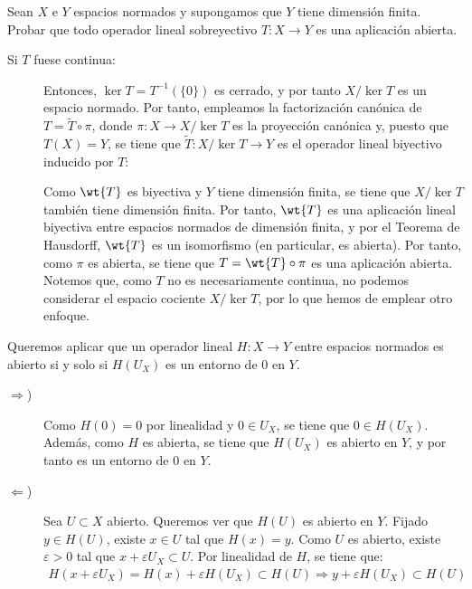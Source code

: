 \begin{ejercicio}\label{ej:operador_lineal_abierto}
Sean $X$ e $Y$ espacios normados y supongamos que $Y$ tiene dimensión finita. Probar que todo operador lineal sobreyectivo $T: X \longrightarrow Y$ es una aplicación abierta.

\begin{description}
    \item[Si $T$ fuese continua:] Entonces, $\ker T=T^{-1}(\{0\})$ es cerrado, y por tanto $X/\ker T$ es un espacio normado. Por tanto, empleamos la factorización canónica de $T = \tilde{T} \circ \pi$, donde $\pi: X \longrightarrow X/\ker T$ es la proyección canónica y, puesto que $T(X) = Y$, se tiene que $\tilde{T}: X/\ker T \longrightarrow Y$ es el operador lineal biyectivo inducido por $T$:
    \begin{figure}[h]
        \centering
    \end{figure}

    Como $\wt{T}$ es biyectiva y $Y$ tiene dimensión finita, se tiene que $X/\ker T$ también tiene dimensión finita. Por tanto, $\wt{T}$ es una aplicación lineal biyectiva entre espacios normados de dimensión finita, y por el Teorema de Hausdorff, $\wt{T}$ es un isomorfismo (en particular, es abierta). Por tanto, como $\pi$ es abierta, se tiene que $T = \wt{T} \circ \pi$ es una aplicación abierta.\\

    Notemos que, como $T$ no es necesariamente continua, no podemos considerar el espacio cociente $X/\ker T$, por lo que hemos de emplear otro enfoque.
\end{description}

Queremos aplicar que un operador lineal $H: X \longrightarrow Y$ entre espacios normados es abierto si y solo si $H(U_X)$ es un entorno de $0$ en $Y$.
\begin{description}
    \item[$\Longrightarrow$)] Como $H(0)=0$ por linealidad y $0\in U_X$, se tiene que $0 \in H(U_X)$. Además, como $H$ es abierta, se tiene que $H(U_X)$ es abierto en $Y$, y por tanto es un entorno de $0$ en $Y$.
    \item[$\Longleftarrow$)] Sea $U\subset X$ abierto. Queremos ver que $H(U)$ es abierto en $Y$. Fijado $y\in H(U)$, existe $x \in U$ tal que $H(x) = y$. Como $U$ es abierto, existe $\varepsilon > 0$ tal que $x + \varepsilon U_X \subset U$. Por linealidad de $H$, se tiene que:
    \begin{align*}
        H(x+\varepsilon U_X) = H(x) + \varepsilon H(U_X) \subset H(U)
        \Longrightarrow y+\varepsilon H(U_X) \subset H(U)
    \end{align*}


\end{description}
\end{ejercicio}
